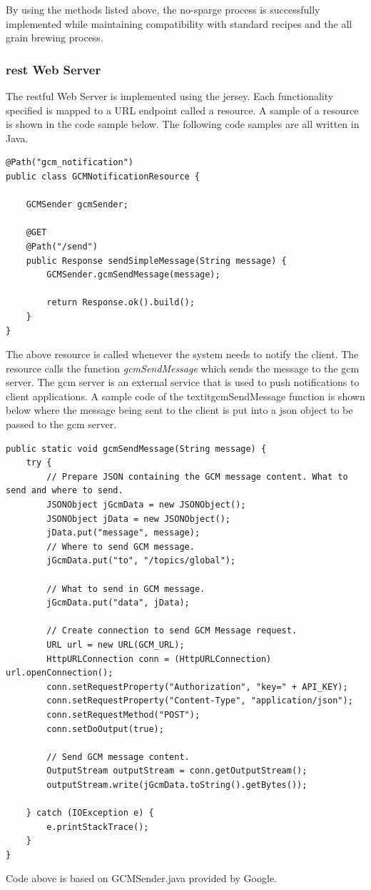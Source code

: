 \documentclass{article}
\begin{document}
By using the methods listed above, the no-sparge process is successfully implemented while maintaining compatibility with standard recipes and the all grain brewing process.

\subsubsection{\gls{rest} Web Server}
The \gls{rest}ful Web Server is implemented using the \gls{jersey}. Each functionality specified is mapped to a URL endpoint called a \gls{resource}. A sample of a resource is shown in the code sample below. The following code samples are all written in Java.

\begin{lstlisting}
@Path("gcm_notification")
public class GCMNotificationResource {

    GCMSender gcmSender;

    @GET
    @Path("/send")
    public Response sendSimpleMessage(String message) {
        GCMSender.gcmSendMessage(message);

        return Response.ok().build();
    }
}
\end{lstlisting}

\noindent The above resource is called whenever the system needs to notify the client. The resource calls the function \textit{gcmSendMessage} which sends the message to the \gls{gcm} server. The \gls{gcm} server is an external service that is used to push notifications to client applications. A sample code of the textit{gcmSendMessage} function is shown below where the message being sent to the client is put into a \gls{json} object to be passed to the \gls{gcm} server. 
\linebreak
\linebreak
\begin{lstlisting}
public static void gcmSendMessage(String message) {
    try {
        // Prepare JSON containing the GCM message content. What to send and where to send.
        JSONObject jGcmData = new JSONObject();
        JSONObject jData = new JSONObject();
        jData.put("message", message);
        // Where to send GCM message.
        jGcmData.put("to", "/topics/global");
       
        // What to send in GCM message.
        jGcmData.put("data", jData);

        // Create connection to send GCM Message request.
        URL url = new URL(GCM_URL);
        HttpURLConnection conn = (HttpURLConnection) url.openConnection();
        conn.setRequestProperty("Authorization", "key=" + API_KEY);
        conn.setRequestProperty("Content-Type", "application/json");
        conn.setRequestMethod("POST");
        conn.setDoOutput(true);

        // Send GCM message content.
        OutputStream outputStream = conn.getOutputStream();
        outputStream.write(jGcmData.toString().getBytes());

    } catch (IOException e) {
        e.printStackTrace();
    }
}
\end{lstlisting}
\cite{gcm-sendnotification} Code above is based on GCMSender.java provided by Google.
\end{document}
